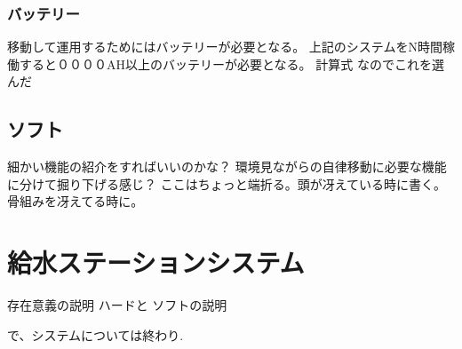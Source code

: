 \subsubsection{バッテリー}
移動して運用するためにはバッテリーが必要となる。
上記のシステムをN時間稼働すると００００AH以上のバッテリーが必要となる。
計算式
なのでこれを選んだ

\subsection{ソフト}
細かい機能の紹介をすればいいのかな？
環境見ながらの自律移動に必要な機能に分けて掘り下げる感じ？
ここはちょっと端折る。頭が冴えている時に書く。骨組みを冴えてる時に。

\section{給水ステーションシステム}
存在意義の説明
ハードと
ソフトの説明


で、システムについては終わり.


